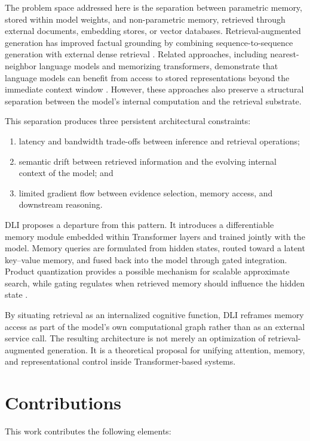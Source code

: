 The problem space addressed here is the separation between parametric memory, stored within model weights, and non-parametric memory, retrieved through external documents, embedding stores, or vector databases. Retrieval-augmented generation has improved factual grounding by combining sequence-to-sequence generation with external dense retrieval \cite{Lewis2021}. Related approaches, including nearest-neighbor language models and memorizing transformers, demonstrate that language models can benefit from access to stored representations beyond the immediate context window \cite{Khandelwal2020,Wu2022}. However, these approaches also preserve a structural separation between the model's internal computation and the retrieval substrate.

This separation produces three persistent architectural constraints:

\begin{enumerate}
    \item latency and bandwidth trade-offs between inference and retrieval operations;
    \item semantic drift between retrieved information and the evolving internal context of the model; and
    \item limited gradient flow between evidence selection, memory access, and downstream reasoning.
\end{enumerate}

DLI proposes a departure from this pattern. It introduces a differentiable memory module embedded within Transformer layers and trained jointly with the model. Memory queries are formulated from hidden states, routed toward a latent key--value memory, and fused back into the model through gated integration. Product quantization provides a possible mechanism for scalable approximate search, while gating regulates when retrieved memory should influence the hidden state \cite{Jgou2011,Johnson2021,Lepikhin2020}.

By situating retrieval as an internalized cognitive function, DLI reframes memory access as part of the model's own computational graph rather than as an external service call. The resulting architecture is not merely an optimization of retrieval-augmented generation. It is a theoretical proposal for unifying attention, memory, and representational control inside Transformer-based systems.

\section*{Contributions}
This work contributes the following elements:


